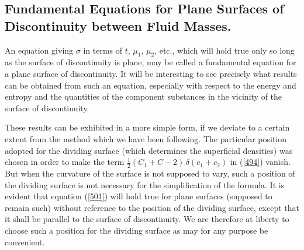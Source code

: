\documentclass[12pt]{article}
\newcommand{\dd}{\delta}
\begin{document}
{\subsection{Fundamental Equations for Plane Surfaces of Discontinuity between Fluid Masses.}
An equation giving $\sigma$ in terms of $t$, $\mu_1$, $\mu_2$, etc., which will hold true only so long as the surface of discontinuity is plane, may be called a fundamental equation for a plane surface of discontinuity. It will be interesting to see precisely what results can be obtained from such an equation, especially with respect to the energy and entropy and the quantities of the component substances in the vicinity of the surface of discontinuity.


These results can be exhibited in a more simple form, if we deviate to a certain extent from the method which we have been following. The particular position adopted for the dividing surface (which determines the superficial densities) was chosen in order to make the term  $\tfrac{1}{2}(C_1+C-2)\, \dd (c_1 +c_2)$ in (\ref{494}) vanish. But when the curvature of the surface is not supposed to vary, such a position of the dividing surface is not necessary for the simplification of the formula. It is evident that equation (\ref{501}) will hold true for plane surfaces (supposed to remain such) without reference to the position of the dividing surface, except that it shall be parallel to the surface of discontinuity. We are therefore at liberty to choose such a position for the dividing surface as may for any purpose be convenient.


}
\end{document}
